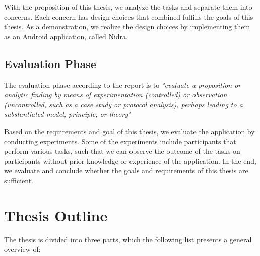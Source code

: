 With the proposition of this thesis, we analyze the tasks and separate them into concerns. Each concern has design choices that combined fulfills the goals of this thesis. As a demonstration, we realize the design choices by implementing them as an Android application, called Nidra. 

\subsection{Evaluation Phase}
The evaluation phase according to the report is to \textit{"evaluate a proposition or analytic finding by means of experimentation (controlled) or observation (uncontrolled, such as a case study or protocol analysis), perhaps leading to a substantiated model, principle, or theory"}

Based on the requirements and goal of this thesis, we evaluate the application by conducting experiments. Some of the experiments include participants that perform various tasks, such that we can observe the outcome of the tasks on participants without prior knowledge or experience of the application. In the end, we evaluate and conclude whether the goals and requirements of this thesis are sufficient.

\section{Thesis Outline}
The thesis is divided into three parts, which the following list presents a general overview of:

